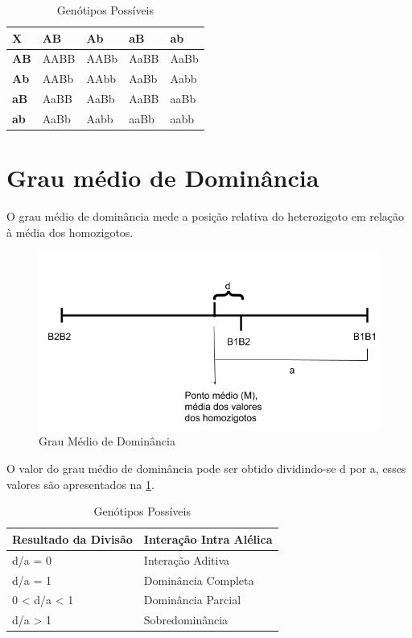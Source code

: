 \begin{table}[H]
\centering
\begin{tabular}{l l l l l}
\toprule
 \textbf{X} & \textbf{AB} & \textbf{Ab} & \textbf{aB} & \textbf{ab} \\
\midrule
 \textbf{AB} & AABB & AABb & AaBB & AaBb \\
 \textbf{Ab} & AABb & AAbb & AaBb & Aabb \\
 \textbf{aB} & AaBB & AaBb & AaBB & aaBb \\
 \textbf{ab} & AaBb & Aabb & aaBb & aabb \\
 
\bottomrule
\end{tabular}
\caption{Genótipos Possíveis} \label{tab:t04}
\end{table}


\section{Grau médio de Dominância}

O grau médio de dominância mede a posição relativa do heterozigoto em relação à média dos homozigotos. 

\begin{figure}[h]
  \includegraphics[width=0.9\linewidth]{img/grau-medio-dominancia.png}
  \caption{Grau Médio de Dominância}
  \label{fig:boat1}
\end{figure}


O valor do grau médio de dominância pode ser obtido dividindo-se d por a, esses valores são apresentados na \ref{fig:boat1}.


\begin{table}[H]
\centering
\begin{tabular}{l l }
\toprule
 \textbf{Resultado da Divisão} & \textbf{Interação Intra Alélica} \\
\midrule
 d/a = 0     & Interação  Aditiva  \\
 d/a = 1     & Dominância Completa \\
 0 < d/a < 1 & Dominância Parcial  \\
 d/a > 1     & Sobredominância     \\
\bottomrule
\end{tabular}
\caption{Genótipos Possíveis} \label{tab:t04}
\end{table}

